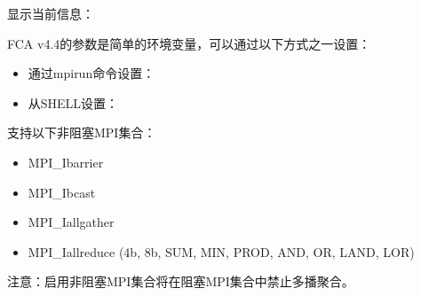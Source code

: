 \documentclass[a4paper,12pt,english]{sphinxmanual}
\begin{document}
\sphinxAtStartPar
{}

\sphinxAtStartPar
显示当前信息：

\sphinxAtStartPar
{}

\sphinxAtStartPar
FCA v4.4的参数是简单的环境变量，可以通过以下方式之一设置：
\begin{itemize}
\item {} 
\sphinxAtStartPar
通过mpirun命令设置：

\sphinxAtStartPar
{}

\item {} 
\sphinxAtStartPar
从SHELL设置：

\sphinxAtStartPar
{}

\sphinxAtStartPar
{}

\end{itemize}

\sphinxAtStartPar
{}

\sphinxAtStartPar
{}

\sphinxAtStartPar
{}

\sphinxAtStartPar
{}

\sphinxAtStartPar
支持以下非阻塞MPI集合：
\begin{itemize}
\item {} 
\sphinxAtStartPar
MPI\_Ibarrier

\item {} 
\sphinxAtStartPar
MPI\_Ibcast

\item {} 
\sphinxAtStartPar
MPI\_Iallgather

\item {} 
\sphinxAtStartPar
MPI\_Iallreduce (4b, 8b, SUM, MIN, PROD, AND, OR, LAND, LOR)

\end{itemize}

\sphinxAtStartPar
注意：启用非阻塞MPI集合将在阻塞MPI集合中禁止多播聚合。

\sphinxAtStartPar
{}
\end{document}
